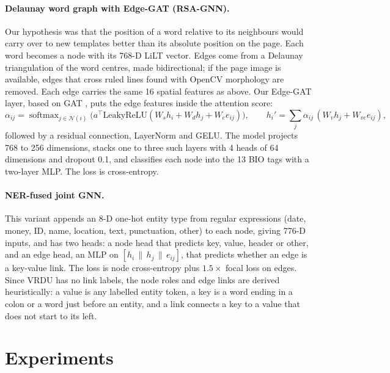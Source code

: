 \documentclass[11pt,a4paper]{article}
\begin{document}
\paragraph{Delaunay word graph with Edge-GAT (RSA-GNN).} Our hypothesis was that the position of a word relative to its neighbours would carry over to new templates better than its absolute position on the page. Each word becomes a node with its 768-D LiLT vector. Edges come from a Delaunay triangulation of the word centres, made bidirectional; if the page image is available, edges that cross ruled lines found with OpenCV morphology are removed. Each edge carries the same 16 spatial features as above. Our Edge-GAT layer, based on GAT \cite{gat}, puts the edge features inside the attention score:
\begin{equation}
\alpha_{ij} = \operatorname{softmax}_{j \in \mathcal{N}(i)}\!\big(a^\top \mathrm{LeakyReLU}(W_s h_i + W_d h_j + W_e e_{ij})\big),
\qquad
h_i' = \sum_{j} \alpha_{ij}\,(W_v h_j + W_{ve} e_{ij}),
\end{equation}
followed by a residual connection, LayerNorm and GELU. The model projects 768 to 256 dimensions, stacks one to three such layers with 4 heads of 64 dimensions and dropout 0.1, and classifies each node into the 13 BIO tags with a two-layer MLP. The loss is cross-entropy.

\paragraph{NER-fused joint GNN.} This variant appends an 8-D one-hot entity type from regular expressions (date, money, ID, name, location, text, punctuation, other) to each node, giving 776-D inputs, and has two heads: a node head that predicts key, value, header or other, and an edge head, an MLP on $[h_i \,\|\, h_j \,\|\, e_{ij}]$, that predicts whether an edge is a key-value link. The loss is node cross-entropy plus $1.5\times$ focal loss on edges. Since VRDU has no link labels, the node roles and edge links are derived heuristically: a value is any labelled entity token, a key is a word ending in a colon or a word just before an entity, and a link connects a key to a value that does not start to its left.

\section{Experiments}
\end{document}
